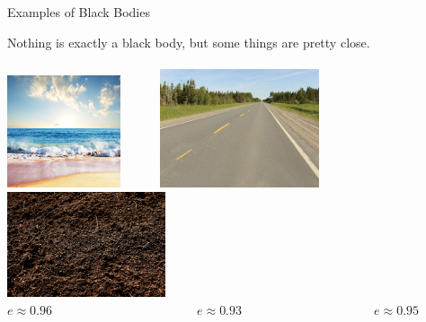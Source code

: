 \documentclass{beamer}
\begin{document}
\begin{frame}{Examples of Black Bodies}
\begin{center}
   Nothing is exactly a black body, but some things are pretty close.
   ~\\~\\
   \includegraphics[width=0.25\textwidth]{figures/ocean.jpg}
   ~~~~~
   \includegraphics[width=0.35\textwidth]{figures/asphalt.jpg}
   ~~~~~
   \includegraphics[width=0.35\textwidth]{figures/dirt.jpg}
   \\ $e\approx0.96$~~~~~~~~~~~~~~~~~~~~~~~$e\approx0.93$~~~~~~~~~~~~~~~~~~~~~$e\approx0.95$
\end{center}
\end{frame}
\end{document}
